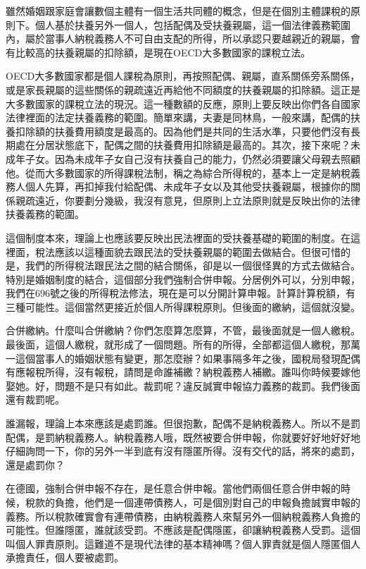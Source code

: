 \documentclass[oneside,sub3section]{ctexbook}
\begin{document}
雖然婚姻跟家庭會讓數個主體有一個生活共同體的概念，但是在個別主體課稅的原則下。個人基於扶養另外一個人，包括配偶及受扶養親屬，這一個法律義務範圍內，屬於當事人納稅義務人不可自由支配的所得，所以承認只要越親近的親屬，會有比較高的扶養親屬的扣除額，是現在OECD大多數國家的課稅立法。

OECD大多數國家都是個人課稅為原則，再按照配偶、親屬，直系關係旁系關係，或是家長親屬的這些關係的親疏遠近再給他不同額度的扶養親屬的扣除額。這正是大多數國家的課稅立法的現況。這一種數額的反應，原則上要反映出你們各自國家法律裡面的法定扶養義務的範圍。簡單來講，夫妻是同林鳥，一般來講，配偶的扶養扣除額的扶養費用額度是最高的。因為他們是共同的生活水準，只要他們沒有長期處在分居狀態底下，配偶之間的扶養費用扣除額是最高的。其次，接下來呢？未成年子女。因為未成年子女自己沒有扶養自己的能力，仍然必須要讓父母親去照顧他。從而大多數國家的所得課稅法制，稱之為綜合所得稅的，基本上一定是納稅義務人個人先算，再扣掉我付給配偶、未成年子女以及其他受扶養親屬，根據你的關係親疏遠近，你要劃分幾級，我沒有意見，但原則上立法原則就是反映出你的法律扶養義務的範圍。

這個制度本來，理論上也應該要反映出民法裡面的受扶養基礎的範圍的制度。在這裡面，稅法應該以這種面貌去跟民法的受扶養親屬的範圍去做結合。但很可惜的是，我們的所得稅法跟民法之間的結合關係，卻是以一個很怪異的方式去做結合。特別是婚姻制度的結合，這個部分我們強制合併申報。分居例外可以，分別申報，我們在696號之後的所得稅法修法，現在是可以分開計算申報。計算計算稅額，有三種可能性。這個當然更接近於個人所得課稅原則。但後面的繳納，這個就沒變。

合併繳納。什麼叫合併繳納？你們怎麼算怎麼算，不管，最後面就是一個人繳稅。最後面，這個人繳稅，就形成了一個問題。所有的所得，全部都這個人繳稅，那萬一這個當事人的婚姻狀態有變更，那怎麼辦？如果事隔多年之後，國稅局發現配偶有應報稅所得，沒有報稅，請問是命誰補繳？納稅義務人補繳。誰叫你時候要嫁他娶她。好，問題不是只有如此。裁罰呢？違反誠實申報協力義務的裁罰。我們後面還有裁罰呢。

誰漏報，理論上本來應該是處罰誰。但很抱歉，配偶不是納稅義務人。所以不是罰配偶，是罰納稅義務人。納稅義務人哦，既然被要合併申報，你就要好好地好好地仔細詢問一下，你的另外一半到底有沒有隱匿所得。沒有交代的話，將來的處罰，還是處罰你？

在德國，強制合併申報不存在，是任意合併申報。當他們兩個任意合併申報的時候，稅款的負擔，他們是一個連帶債務人，可是個別對自己的申報負擔誠實申報的義務。所以稅款確實會有連帶債務，由納稅義務人來幫另外一個納稅義務人負擔的可能性。但誰隱匿，誰就該受罰。不應該是配偶隱匿，卻讓納稅義務人受罰。這個叫個人罪責原則。這難道不是現代法律的基本精神嗎？個人罪責就是個人隱匿個人承擔責任，個人要被處罰。
\end{document}
